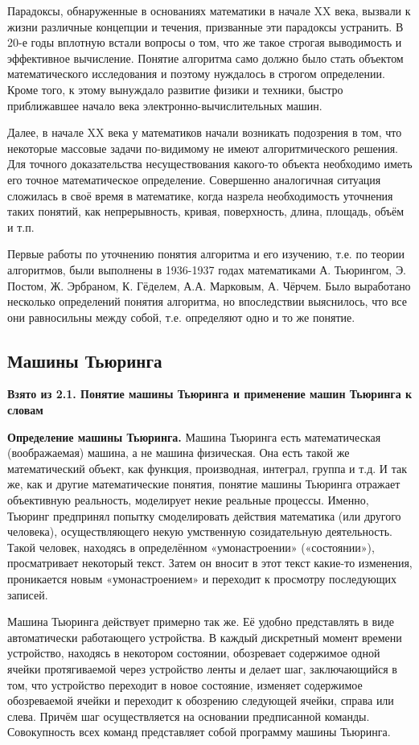 \documentclass[a4paper,12pt]{article}
\begin{document}
Парадоксы, обнаруженные в основаниях математики в начале XX века, вызвали к жизни различные концепции и течения, призванные эти парадоксы устранить. В 20-е годы вплотную встали вопросы о том, что же такое строгая выводимость и эффективное вычисление. Понятие алгоритма само должно было стать объектом математического исследования и поэтому нуждалось в строгом определении. Кроме того, к этому вынуждало развитие физики и техники, быстро приближавшее начало века электронно-вычислительных машин.

Далее, в начале XX века у математиков начали возникать подозрения в том, что некоторые массовые задачи по-видимому не имеют алгоритмического решения. Для точного доказательства несуществования какого-то объекта необходимо иметь его точное математическое определение. Совершенно аналогичная ситуация сложилась в своё время в математике, когда назрела необходимость уточнения таких понятий, как непрерывность, кривая, поверхность, длина, площадь, объём и т.п.

Первые работы по уточнению понятия алгоритма и его изучению, т.е. по теории алгоритмов, были выполнены в 1936-1937 годах математиками А. Тьюрингом, Э. Постом, Ж. Эрбраном, К. Гёделем, А.А. Марковым, А. Чёрчем. Было выработано несколько определений понятия алгоритма, но впоследствии выяснилось, что все они равносильны между собой, т.е. определяют одно и то же понятие.

\subsection{Машины Тьюринга}

\textbf{Взято из 2.1. Понятие машины Тьюринга и применение машин Тьюринга к словам}

\textbf{Определение машины Тьюринга.} Машина Тьюринга есть математическая (воображаемая) машина, а не машина физическая. Она есть такой же математический объект, как функция, производная, интеграл, группа и т.д. И так же, как и другие математические понятия, понятие машины Тьюринга отражает объективную реальность, моделирует некие реальные процессы. Именно, Тьюринг предпринял попытку смоделировать действия математика (или другого человека), осуществляющего некую умственную созидательную деятельность. Такой человек, находясь в определённом «умонастроении» («состоянии»), просматривает некоторый текст. Затем он вносит в этот текст какие-то изменения, проникается новым «умонастроением» и переходит к просмотру последующих записей.

Машина Тьюринга действует примерно так же. Её удобно представлять в виде автоматически работающего устройства. В каждый дискретный момент времени устройство, находясь в некотором состоянии, обозревает содержимое одной ячейки протягиваемой через устройство ленты и делает шаг, заключающийся в том, что устройство переходит в новое состояние, изменяет содержимое обозреваемой ячейки и переходит к обозрению следующей ячейки, справа или слева. Причём шаг осуществляется на основании предписанной команды. Совокупность всех команд представляет собой программу машины Тьюринга.
\end{document}
